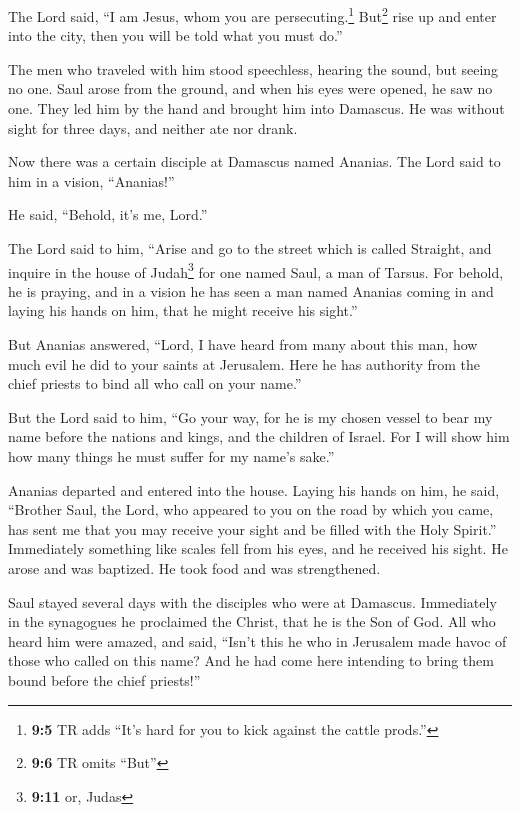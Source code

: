 \begin{paracol}{2}
\begin{otherlanguage}{english}
The Lord said, ``I am Jesus, whom you are persecuting.\footnote{\textbf{9:5}
  TR adds ``It's hard for you to kick against the cattle prods.''}
 But\footnote{\textbf{9:6} TR omits ``But''} rise up and
enter into the city, then you will be told what you must do.''

 The men who traveled with him stood speechless, hearing
the sound, but seeing no one.  Saul arose from the ground,
and when his eyes were opened, he saw no one. They led him by the hand
and brought him into Damascus.  He was without sight for
three days, and neither ate nor drank.

 Now there was a certain disciple at Damascus named
Ananias. The Lord said to him in a vision, ``Ananias!''

He said, ``Behold, it's me, Lord.''

 The Lord said to him, ``Arise and go to the street which
is called Straight, and inquire in the house of Judah\footnote{\textbf{9:11}
  or, Judas} for one named Saul, a man of Tarsus. For behold, he is
praying,  and in a vision he has seen a man named Ananias
coming in and laying his hands on him, that he might receive his
sight.''

 But Ananias answered, ``Lord, I have heard from many
about this man, how much evil he did to your saints at Jerusalem.
 Here he has authority from the chief priests to bind all
who call on your name.''

 But the Lord said to him, ``Go your way, for he is my
chosen vessel to bear my name before the nations and kings, and the
children of Israel.  For I will show him how many things
he must suffer for my name's sake.''

 Ananias departed and entered into the house. Laying his
hands on him, he said, ``Brother Saul, the Lord, who appeared to you on
the road by which you came, has sent me that you may receive your sight
and be filled with the Holy Spirit.''  Immediately
something like scales fell from his eyes, and he received his sight. He
arose and was baptized.  He took food and was
strengthened.

Saul stayed several days with the disciples who were at Damascus.
 Immediately in the synagogues he proclaimed the Christ,
that he is the Son of God.  All who heard him were
amazed, and said, ``Isn't this he who in Jerusalem made havoc of those
who called on this name? And he had come here intending to bring them
bound before the chief priests!''


\end{otherlanguage}
\end{paracol}
